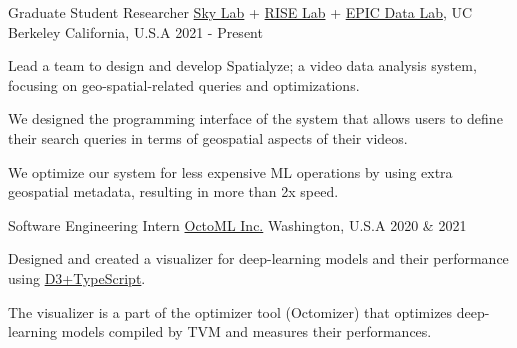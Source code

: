 

\begin{cventries}

  \cvwork
    {Graduate Student Researcher} %
    {
        \href{https://sky.cs.berkeley.edu/}{Sky Lab} +
        \href{https://rise.cs.berkeley.edu/}{RISE Lab} +
        \href{https://epic.berkeley.edu/}{EPIC Data Lab}, UC Berkeley
    } %
    {California, U.S.A} %
    {2021 - Present} %
    {
      \begin{cvitems} %
        \item{Lead a team to design and develop Spatialyze; a video data analysis system, focusing on geo-spatial-related queries and optimizations.}
        \item{We designed the programming interface of the system that allows users to define their search queries in terms of geospatial aspects of their videos.}
        \item{We optimize our system for less expensive ML operations by using extra geospatial metadata, resulting in more than 2x speed.}
      \end{cvitems}
    }

  \cvwork
    {Software Engineering Intern} %
    {\href{https://octoml.ai/}{OctoML Inc.}} %
    {Washington, U.S.A} %
    {2020 \& 2021} %
    {
      \begin{cvitems} %
          \item{Designed and created a visualizer for deep-learning models and their performance using \underline{D3+TypeScript}.}
          \item{The visualizer is a part of the optimizer tool (Octomizer) that optimizes deep-learning models compiled by TVM and measures their performances.}
      \end{cvitems}
    }


\end{cventries}

